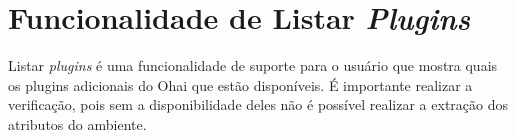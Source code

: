 \section{Funcionalidade de Listar \textit{Plugins}}
\label{sec:list}

Listar \textit{plugins} é uma funcionalidade de suporte para o usuário
que mostra quais os plugins adicionais do Ohai que estão
disponíveis. É importante realizar a verificação, pois
sem a disponibilidade deles não é possível realizar a extração
dos atributos do ambiente.
